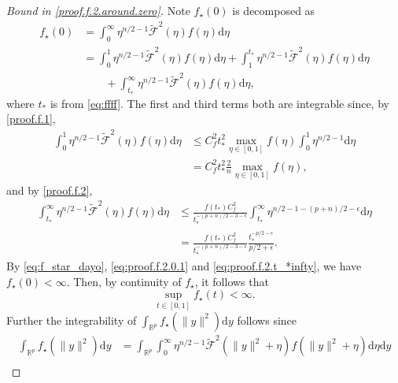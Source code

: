 \documentclass[preprint,11pt]{imsart}
\numberwithin{equation}{section}
\theoremstyle{plain}
\theoremstyle{definition}
\theoremstyle{remark}
\newcommand{\rd}{\mathrm{d}}
\begin{document}
\begin{proof}
[Bound in \eqref{proof.f.2.around.zero}] 
Note $f_\star(0)$ is decomposed as
\begin{equation}\label{eq:f_star_dayo}
 \begin{split}
 f_\star(0)&=\int_0^\infty \eta^{n/2-1}\tilde{\mathcal{F}}^2(\eta)f(\eta)\rd \eta \\
  &=\int_0^1\eta^{n/2-1}\tilde{\mathcal{F}}^2(\eta)f(\eta)\rd \eta+
  \int_1^{t_*}\eta^{n/2-1}\tilde{\mathcal{F}}^2(\eta)f(\eta)\rd \eta \\
&\qquad + \int_{t_*}^\infty\eta^{n/2-1}\tilde{\mathcal{F}}^2(\eta)f(\eta)\rd \eta ,
 \end{split}
\end{equation} 
where $t_*$ is from \eqref{eq:ffff}.
The first and third terms both are integrable since,
 by \eqref{proof.f.1},
\begin{equation}\label{eq:proof.f.2.0.1}
 \begin{split}
  \int_0^1\eta^{n/2-1}\tilde{\mathcal{F}}^2(\eta)f(\eta)\rd \eta 
&\leq C_f^2t_*^2\max_{\eta\in[0,1]}f(\eta)
 \int_0^1\eta^{n/2-1}\rd\eta \\
& =C_f^2t_*^2\frac{2}{n}\max_{\eta\in[0,1]}f(\eta),
 \end{split}
\end{equation}
 and by \eqref{proof.f.2},
\begin{equation}\label{eq:proof.f.2.t_*infty}
 \begin{split}
  \int_{t_*}^\infty \eta^{n/2-1}\tilde{\mathcal{F}}^2(\eta)f(\eta)\rd \eta 
  &\leq
\frac{f(t_*)C_f^2}{t_*^{-(p+n)/2-3-\epsilon}}
\int_{t_*}^\infty  \eta^{n/2-1-(p+n)/2-\epsilon} \rd \eta \\
  & =
\frac{f(t_*)C_f^2}{t_*^{-(p+n)/2-3-\epsilon}}\frac{t_*^{-p/2-\epsilon}}{p/2+\epsilon}.
 \end{split}
\end{equation}
 By \eqref{eq:f_star_dayo}, \eqref{eq:proof.f.2.0.1} and \eqref{eq:proof.f.2.t_*infty}, we have
$f_\star(0)<\infty$. Then, by continuity of $f_\star$, it follows that
 \begin{equation}\label{eq:f_star_0_1}
\sup_{t\in[0,1]}f_\star(t)<\infty.
 \end{equation}
  Further the integrability of $\int_{\mathbb{R}^p}f_\star(\|y\|^2)\rd y $ follows since
\begin{equation}\label{eq:int_f_star}
 \begin{split}
     \int_{\mathbb{R}^p}f_\star(\|y\|^2)\rd y 
& = \int_{\mathbb{R}^p}\int_0^\infty \eta^{n/2-1}\tilde{\mathcal{F}}^2(\|y\|^2+\eta)f(\|y\|^2+\eta)\rd \eta \rd y\\

\end{split}
\end{equation}
\end{proof}
\end{document}
